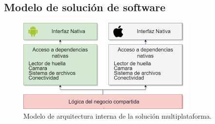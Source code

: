 \documentclass[10pt]{article}
\begin{document}
\subsection{Modelo de  solución de software}
\begin{figure}[H]
    \begin{center}
    \includegraphics[width=0.8\textwidth]{Imagenes/12.PNG}
    \caption{Modelo de arquitectura interna de la solución multiplataforma.}
\label{fig1}
    \end{center}
\end{figure} 
\end{document}
